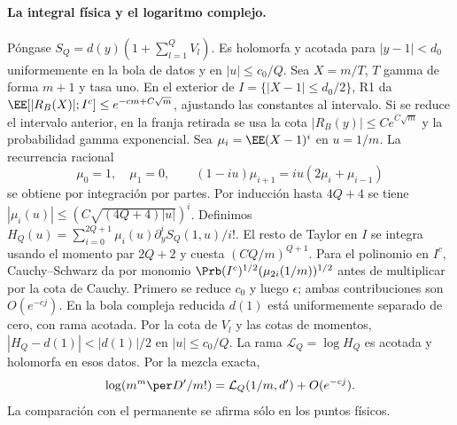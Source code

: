 \paragraph{La integral física y el logaritmo complejo.}
Póngase $S_Q=d(y)(1+\sum_{l=1}^QV_l)$. Es holomorfa y acotada para $|y-1|<d_0$
uniformemente en la bola de datos y en $|u|\le c_0/Q$. Sea $X=m/T$, $T$ gamma de
forma $m+1$ y tasa uno. En el exterior de $I=\{|X-1|\le d_0/2\}$, R1 da
$\EE[|R_B(X)|;I^c]\le e^{-cm+C\sqrt m}$, ajustando las constantes al intervalo.
Si se reduce el intervalo anterior, en la franja retirada se usa la cota
$|R_B(y)|\le Ce^{C\sqrt m}$ y la probabilidad gamma exponencial.
Sea $\mu_i=\EE(X-1)^i$ en $u=1/m$. La recurrencia racional
\[
 \mu_0=1,\quad \mu_1=0,\qquad
 (1-iu)\mu_{i+1}=iu(2\mu_i+\mu_{i-1})
\]
se obtiene por integración por partes. Por inducción hasta $4Q+4$ se tiene
$|\mu_i(u)|\le(C\sqrt{(4Q+4)|u|})^i$. Definimos
$H_Q(u)=\sum_{i=0}^{2Q+1}\mu_i(u)\partial_y^i S_Q(1,u)/i!$.
El resto de Taylor en $I$ se integra usando el momento par $2Q+2$ y cuesta
$(C Q/m)^{Q+1}$. Para el polinomio en $I^c$, Cauchy--Schwarz da por monomio
$\Prb(I^c)^{1/2}(\mu_{2i}(1/m))^{1/2}$ antes de multiplicar por la cota de Cauchy.
Primero se reduce $c_0$ y luego $\epsilon$; ambas contribuciones son $O(e^{-cj})$.
En la bola compleja reducida $d(1)$ está uniformemente separado de cero, con rama acotada.
Por la cota de $V_l$ y las cotas de momentos, $|H_Q-d(1)|<|d(1)|/2$ en $|u|\le c_0/Q$.
La rama $\mathcal L_Q=\log H_Q$ es acotada y holomorfa en esos datos. Por la mezcla exacta,
\[
 \log(m^m\per D'/m!)=\mathcal L_Q(1/m,d')+O(e^{-c j}).
\]
La comparación con el permanente se afirma sólo en los puntos físicos.
